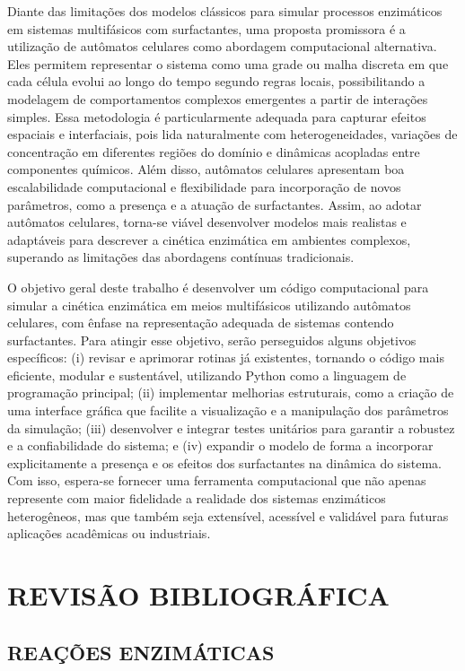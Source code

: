 \documentclass[12pt,oneside]{report}
\begin{document}
Diante das limitações dos modelos clássicos para simular processos enzimáticos em sistemas multifásicos com surfactantes, uma proposta promissora é a utilização de autômatos celulares como abordagem computacional alternativa. Eles permitem representar o sistema como uma grade ou malha discreta em que cada célula evolui ao longo do tempo segundo regras locais, possibilitando a modelagem de comportamentos complexos emergentes a partir de interações simples. Essa metodologia é particularmente adequada para capturar efeitos espaciais e interfaciais, pois lida naturalmente com heterogeneidades, variações de concentração em diferentes regiões do domínio e dinâmicas acopladas entre componentes químicos. Além disso, autômatos celulares apresentam boa escalabilidade computacional e flexibilidade para incorporação de novos parâmetros, como a presença e a atuação de surfactantes. Assim, ao adotar autômatos celulares, torna-se viável desenvolver modelos mais realistas e adaptáveis para descrever a cinética enzimática em ambientes complexos, superando as limitações das abordagens contínuas tradicionais.

O objetivo geral deste trabalho é desenvolver um código computacional para simular a cinética enzimática em meios multifásicos utilizando autômatos celulares, com ênfase na representação adequada de sistemas contendo surfactantes. Para atingir esse objetivo, serão perseguidos alguns objetivos específicos: (i) revisar e aprimorar rotinas já existentes, tornando o código mais eficiente, modular e sustentável, utilizando Python como a linguagem de programação principal; (ii) implementar melhorias estruturais, como a criação de uma interface gráfica que facilite a visualização e a manipulação dos parâmetros da simulação; (iii) desenvolver e integrar testes unitários para garantir a robustez e a confiabilidade do sistema; e (iv) expandir o modelo de forma a incorporar explicitamente a presença e os efeitos dos surfactantes na dinâmica do sistema. Com isso, espera-se fornecer uma ferramenta computacional que não apenas represente com maior fidelidade a realidade dos sistemas enzimáticos heterogêneos, mas que também seja extensível, acessível e validável para futuras aplicações acadêmicas ou industriais.


\chapter{REVISÃO BIBLIOGRÁFICA}
\section{REAÇÕES ENZIMÁTICAS}
\end{document}

